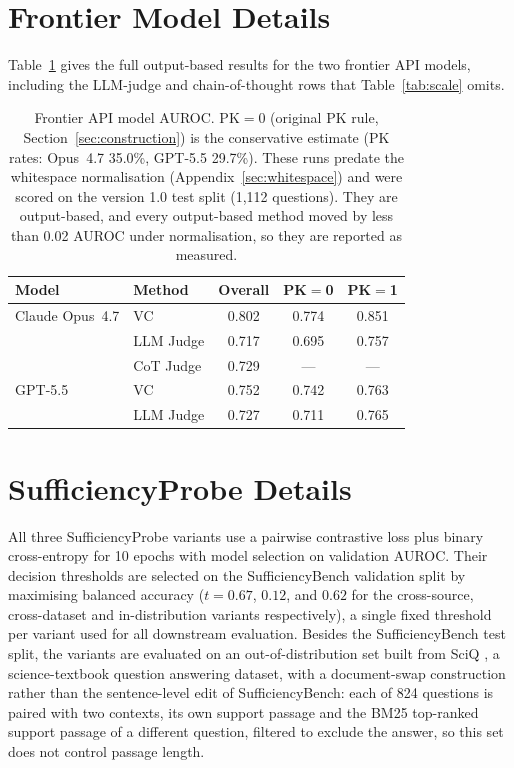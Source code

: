 \documentclass[acmsmall,screen,review]{acmart}
\newcommand{\bench}{SufficiencyBench}
\newcommand{\sprobe}{SufficiencyProbe}
\begin{document}
\section{Frontier Model Details}
\label{sec:frontier_app}
Table~\ref{tab:frontier} gives the full output-based results for the two frontier API models, including the LLM-judge and chain-of-thought rows that Table~\ref{tab:scale} omits.
\begin{table}[h]
\centering
\caption{Frontier API model AUROC. PK$=$0 (original PK rule, Section~\ref{sec:construction}) is the conservative estimate (PK rates: Opus~4.7 35.0\%, GPT-5.5 29.7\%). These runs predate the whitespace normalisation (Appendix~\ref{sec:whitespace}) and were scored on the version 1.0 test split (1,112 questions). They are output-based, and every output-based method moved by less than 0.02 AUROC under normalisation, so they are reported as measured.}
\label{tab:frontier}
\small
\begin{tabular}{@{}llccc@{}}
\toprule
Model & Method & Overall & PK$=$0 & PK$=$1 \\
\midrule
Claude Opus~4.7 & VC           & 0.802 & 0.774 & 0.851 \\
                & LLM Judge    & 0.717 & 0.695 & 0.757 \\
                & CoT Judge    & 0.729 & ---   & ---   \\
\midrule
GPT-5.5         & VC           & 0.752 & 0.742 & 0.763 \\
                & LLM Judge    & 0.727 & 0.711 & 0.765 \\
\bottomrule
\end{tabular}
\end{table}

\section{\sprobe{} Details}
\label{sec:sprobe_app}
All three \sprobe{} variants use a pairwise contrastive loss plus binary cross-entropy for 10 epochs with model selection on validation AUROC. Their decision thresholds are selected on the \bench{} validation split by maximising balanced accuracy ($t = 0.67$, $0.12$, and $0.62$ for the cross-source, cross-dataset and in-distribution variants respectively), a single fixed threshold per variant used for all downstream evaluation. Besides the \bench{} test split, the variants are evaluated on an out-of-distribution set built from SciQ \citep{welbl2017sciq}, a science-textbook question answering dataset, with a document-swap construction rather than the sentence-level edit of \bench{}: each of 824 questions is paired with two contexts, its own support passage and the BM25 top-ranked support passage of a different question, filtered to exclude the answer, so this set does not control passage length.
\end{document}
